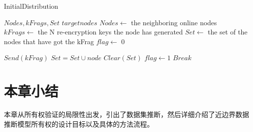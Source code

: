 \begin{algorithm}[H]
	\caption{InitialDistribution}
	\label{alg:1}
	\begin{algorithmic}[1]
		
		\Require $Nodes,kFrags,Set$
		\Ensure $targetnodes$
		\State $Nodes \gets$ the neighboring online nodes
		\State $kFrags \gets$ the N re-encryption keys the node has generated
		\State $Set \gets$ the set of the nodes that have got the kFrag
		\State $flag \gets$ 0
		\State
		\State {}
		\EndIf
		\State {}
		\EndIf
		\EndFor
		
		
		\State    
		\State $Send(kFrag)$
		\State $Set=Set \cup node$
		\State $Clear(Set)$
		\EndIf
		\State $flag \gets 1$
		\State $Break$
		
		
		\EndIf
		\EndFor
		\EndFunction
		
		
	\end{algorithmic}
\end{algorithm}

\section{本章小结}

本章从所有权验证的局限性出发，引出了数据集推断，然后详细介绍了近边界数据推断模型所有权的设计目标以及具体的方法流程。

